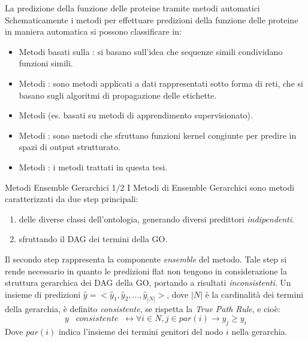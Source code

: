 \documentclass[9pt]{beamer}
\begin{document}
\begin{tframe}{La predizione della funzione delle proteine tramite metodi automatici}
Schematicamente i metodi per effettuare predizioni della funzione delle proteine in maniera automatica si possono classificare in:

\begin{itemize}
\item Metodi basati sulla : si basano sull'idea che sequenze simili condividano funzioni simili.
\item Metodi : sono metodi applicati a dati rappresentati sotto forma di reti, che si basano sugli algoritmi di propagazione delle etichette.
\item Metodi  (es. basati su metodi di apprendimento supervisionato).
\item Metodi : sono metodi che sfruttano funzioni kernel congiunte per predire in spazi di output strutturato.
\item Metodi : i metodi trattati in questa tesi.
\end{itemize}

\end{tframe}

\begin{tframe}{Metodi Ensemble Gerarchici 1/2}
I Metodi di Ensemble Gerarchici sono metodi caratterizzati da due step principali:

\begin{enumerate}
\item {} delle diverse classi dell’ontologia, generando diversi predittori \emph{indipendenti}.
\item {} sfruttando il DAG dei termini della GO.
\end{enumerate}
Il secondo step rappresenta la componente \emph{ensemble} del metodo. Tale step si rende necessario in quanto le predizioni flat non tengono in considerazione la struttura gerarchica dei DAG della GO, portando a risultati \emph{inconsistenti}.
Un insieme di predizioni $\hat{y} = <\hat{y}_1, \hat{y}_2, \dots, \hat{y}_{|N|}>$, dove $|N|$ è la cardinalità dei termini della gerarchia, è definito \emph{consistente}, se rispetta la \emph{True Path Rule}, e cioè:
\[
y\;\;\;consistente\;\; \leftrightarrow \forall i \in N, j \in par(i) \rightarrow y_j \geq y_i
\] 
Dove $par(i)$ indica l'insieme dei termini genitori del nodo $i$ nella gerarchia.
\endblock{}
\end{tframe}
\end{document}
